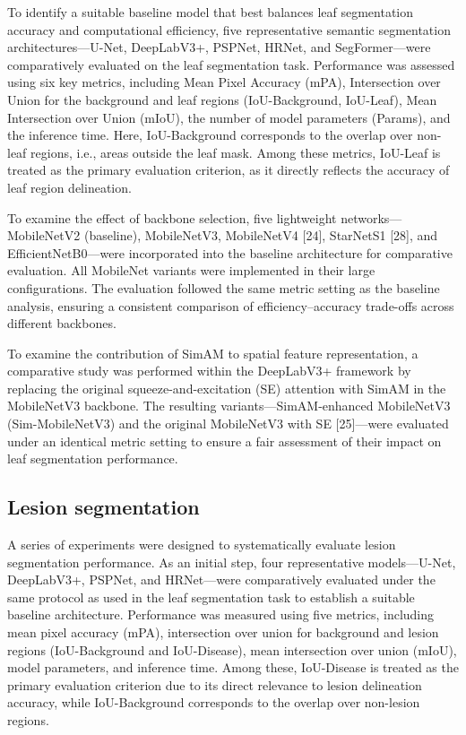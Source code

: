 \documentclass[
]{article}
\begin{document}
To identify a suitable baseline model that best balances leaf
segmentation accuracy and computational efficiency, five representative
semantic segmentation architectures---U-Net, DeepLabV3+, PSPNet, HRNet,
and SegFormer---were comparatively evaluated on the leaf segmentation
task. Performance was assessed using six key metrics, including Mean
Pixel Accuracy (mPA), Intersection over Union for the background and
leaf regions (IoU-Background, IoU-Leaf), Mean Intersection over Union
(mIoU), the number of model parameters (Params), and the inference time.
Here, IoU-Background corresponds to the overlap over non-leaf regions,
i.e., areas outside the leaf mask. Among these metrics, IoU-Leaf is
treated as the primary evaluation criterion, as it directly reflects the
accuracy of leaf region delineation.

To examine the effect of backbone selection, five lightweight
networks---MobileNetV2 (baseline), MobileNetV3, MobileNetV4 {[}24{]},
StarNetS1 {[}28{]}, and EfficientNetB0---were incorporated into the
baseline architecture for comparative evaluation. All MobileNet variants
were implemented in their large configurations. The evaluation followed
the same metric setting as the baseline analysis, ensuring a consistent
comparison of efficiency--accuracy trade-offs across different
backbones.

To examine the contribution of SimAM to spatial feature representation,
a comparative study was performed within the DeepLabV3+ framework by
replacing the original squeeze-and-excitation (SE) attention with SimAM
in the MobileNetV3 backbone. The resulting variants---SimAM-enhanced
MobileNetV3 (Sim-MobileNetV3) and the original MobileNetV3 with SE
{[}25{]}---were evaluated under an identical metric setting to ensure a
fair assessment of their impact on leaf segmentation performance.

\hypertarget{lesion-segmentation}{%
\subsection{Lesion segmentation}\label{lesion-segmentation}}

A series of experiments were designed to systematically evaluate lesion
segmentation performance. As an initial step, four representative
models---U-Net, DeepLabV3+, PSPNet, and HRNet---were comparatively
evaluated under the same protocol as used in the leaf segmentation task
to establish a suitable baseline architecture. Performance was measured
using five metrics, including mean pixel accuracy (mPA), intersection
over union for background and lesion regions (IoU-Background and
IoU-Disease), mean intersection over union (mIoU), model parameters, and
inference time. Among these, IoU-Disease is treated as the primary
evaluation criterion due to its direct relevance to lesion delineation
accuracy, while IoU-Background corresponds to the overlap over
non-lesion regions.
\end{document}
